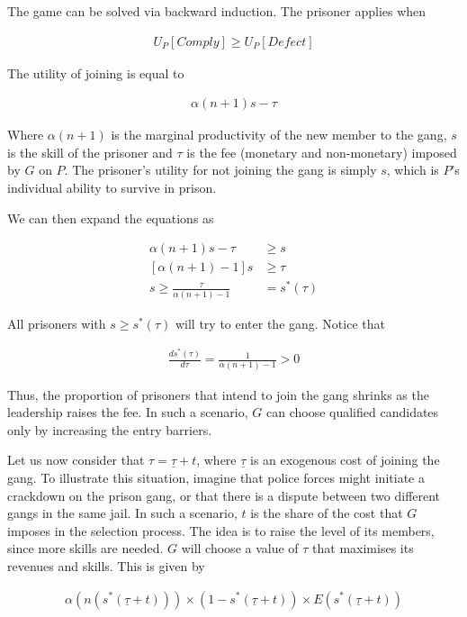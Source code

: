\documentclass[a4paper,12pt]{article}
\begin{document}
The game can be solved via backward induction. The prisoner applies when

\begin{align}
U_P [Comply] \geq U_P [Defect]
\end{align}

The utility of joining is equal to

\begin{align}
\alpha (n+1) s - \tau
\end{align}

Where $\alpha (n+1)$ is the marginal productivity of the new member to the gang, $s$ is the skill of the prisoner and $\tau$ is the fee (monetary and non-monetary) imposed by $G$ on $P$. The prisoner's utility for not joining the gang is simply $s$, which is $P$'s individual ability to survive in prison.

We can then expand the equations as

\begin{equation}
\begin{split}
\alpha (n+1) s - \tau &\geq s\\
[\alpha (n+1) -1] s &\geq \tau\\
s \geq \frac{\tau}{\alpha (n+1) -1} & = s^*(\tau)
\end{split}
\end{equation}

All prisoners with $s \geq s^*(\tau)$ will try to enter the gang. Notice that

\begin{align}
\frac{ds^*(\tau)}{d\tau} = \frac{1}{\alpha (n+1) -1} > 0
\end{align}

Thus, the proportion of prisoners that intend to join the gang shrinks as the leadership raises the fee. In such a scenario, $G$ can choose qualified candidates only by increasing the entry barriers. 

Let us now consider that $\tau = \underline{\tau} + t$, where $\underline{\tau}$ is an exogenous cost of joining the gang. To illustrate this situation, imagine that police forces might initiate a crackdown on the prison gang, or that there is a dispute between two different gangs in the same jail. In such a scenario, $t$ is the share of the cost that $G$ imposes in the selection process. The idea is to raise the level of its members, since more skills are needed. $G$ will choose a value of $\tau$ that maximises its revenues and skills. This is given by

\begin{align}
\alpha (n(s^*(\underline{\tau} + t))) \times (1-s^*(\underline{\tau} +t)) \times E(s^*(\underline{\tau} + t))
\end{align}
\end{document}
